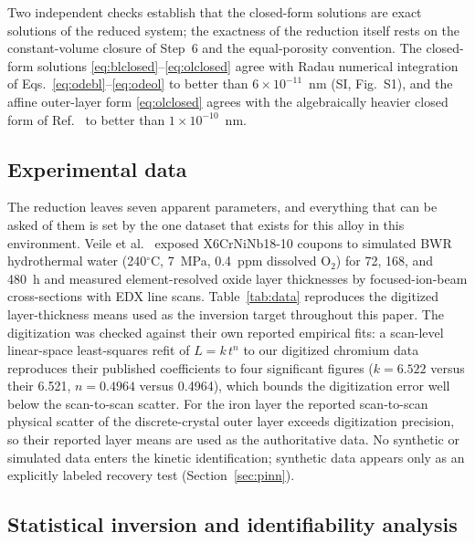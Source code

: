 \documentclass[pdflatex,sn-nature]{sn-jnl}
\begin{document}
Two independent checks establish that the closed-form solutions are
exact solutions of the reduced system; the exactness of the reduction
itself rests on the constant-volume closure of Step~6 and the
equal-porosity convention. The closed-form solutions
\eqref{eq:blclosed}--\eqref{eq:olclosed} agree with Radau numerical
integration of Eqs.~\eqref{eq:odebl}--\eqref{eq:odeol} to better than
$6\times10^{-11}$~nm (SI, Fig.~S1), and the affine outer-layer form
\eqref{eq:olclosed} agrees with the algebraically heavier closed form of
Ref.~\citep{li2020scwpdm} to better than $1\times10^{-10}$~nm.

\subsection{Experimental data}\label{sec:data}

The reduction leaves seven apparent parameters, and everything that can
be asked of them is set by the one dataset that exists for this alloy in
this environment. Veile et al.~\citep{veile2024} exposed X6CrNiNb18-10 coupons to
simulated BWR hydrothermal water (240$^\circ$C, 7~MPa, 0.4~ppm dissolved
O$_2$) for 72, 168, and 480~h and measured element-resolved oxide layer
thicknesses by focused-ion-beam cross-sections with EDX line scans.
Table~\ref{tab:data} reproduces the digitized layer-thickness means used
as the inversion target throughout this paper. The digitization
was checked against their own reported empirical fits: a scan-level
linear-space least-squares refit of $L = k\,t^n$ to our digitized
chromium data reproduces their published coefficients to four
significant figures ($k = 6.522$ versus their 6.521, $n = 0.4964$
versus 0.4964), which bounds the digitization error well below the
scan-to-scan scatter. For the iron layer the reported scan-to-scan
physical scatter of the discrete-crystal outer layer exceeds
digitization precision, so their reported layer means are used as the
authoritative data. No synthetic or simulated data enters the
kinetic identification; synthetic data appears only as an explicitly
labeled recovery test (Section~\ref{sec:pinn}).

\subsection{Statistical inversion and identifiability analysis}\label{sec:stats}
\end{document}
